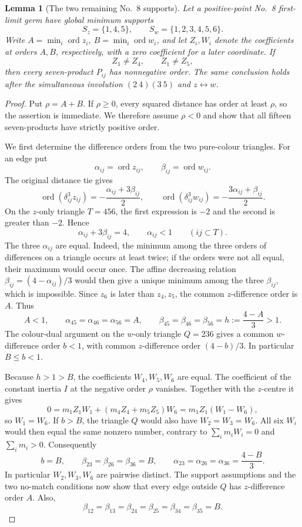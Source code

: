 \documentclass[11pt]{amsart}
\newtheorem{lemma}[theorem]{Lemma}
\theoremstyle{remark}
\newcommand{\ord}{\operatorname{ord}}
\begin{document}
\begin{lemma}[The two remaining No.~8 supports]\label{lem:no8-remaining-support-analytic}
Let a positive-point No.~8 first-limit germ have global minimum supports
\[
S_z=\{1,4,5\},\qquad S_w=\{1,2,3,4,5,6\}.
\]
Write $A=\min_i\ord z_i$, $B=\min_i\ord w_i$, and let $Z_i,W_i$ denote the coefficients at orders $A,B$, respectively, with a zero coefficient for a later coordinate. If
\[
Z_1\ne Z_4,\qquad Z_1\ne Z_5,
\]
then every seven-product $P_{ij}$ has nonnegative order. The same conclusion holds after the simultaneous involution $(2\ 4)(3\ 5)$ and $z\leftrightarrow w$.
\end{lemma}
\begin{proof}
Put $\rho=A+B$. If $\rho\ge0$, every squared distance has order at least $\rho$, so the assertion is immediate. We therefore assume $\rho<0$ and show that all fifteen seven-products have strictly positive order.

We first determine the difference orders from the two pure-colour triangles. For an edge put
\[
\alpha_{ij}=\ord z_{ij},\qquad \beta_{ij}=\ord w_{ij}.
\]
The original distance tie gives
\begin{equation}\label{eq:no8-force-order-analytic}
\ord(\delta_{ij}^3z_{ij})=-\frac{\alpha_{ij}+3\beta_{ij}}2,
\qquad
\ord(\delta_{ij}^3w_{ij})=-\frac{3\alpha_{ij}+\beta_{ij}}2.
\end{equation}
On the $z$-only triangle $T=456$, the first expression is $-2$ and the second is greater than $-2$. Hence
\[
\alpha_{ij}+3\beta_{ij}=4,\qquad \alpha_{ij}<1\qquad(ij\subset T).
\]
The three $\alpha_{ij}$ are equal. Indeed, the minimum among the three orders of differences on a triangle occurs at least twice; if the orders were not all equal, their maximum would occur once. The affine decreasing relation $\beta_{ij}=(4-\alpha_{ij})/3$ would then give a unique minimum among the three $\beta_{ij}$, which is impossible. Since $z_6$ is later than $z_4,z_5$, the common $z$-difference order is $A$. Thus
\[
A<1,\qquad \alpha_{45}=\alpha_{46}=\alpha_{56}=A,
\qquad \beta_{45}=\beta_{46}=\beta_{56}=h:=\frac{4-A}{3}>1.
\]
The colour-dual argument on the $w$-only triangle $Q=236$ gives a common $w$-difference order $b<1$, with common $z$-difference order $(4-b)/3$. In particular $B\le b<1$.

Because $h>1>B$, the coefficients $W_4,W_5,W_6$ are equal. The coefficient of the constant inertia $I$ at the negative order $\rho$ vanishes. Together with the $z$-centre it gives
\[
0=m_1Z_1W_1+(m_4Z_4+m_5Z_5)W_6
  =m_1Z_1(W_1-W_6),
\]
so $W_1=W_6$. If $b>B$, the triangle $Q$ would also have $W_2=W_3=W_6$. All six $W_i$ would then equal the same nonzero number, contrary to $\sum_i m_iW_i=0$ and $\sum_i m_i>0$. Consequently
\begin{equation}\label{eq:no8-Q-orders-analytic}
b=B,\qquad
\beta_{23}=\beta_{26}=\beta_{36}=B,\qquad
\alpha_{23}=\alpha_{26}=\alpha_{36}=\frac{4-B}{3}.
\end{equation}
In particular $W_2,W_3,W_6$ are pairwise distinct. The support assumptions and the two no-match conditions now show that every edge outside $Q$ has $z$-difference order $A$. Also,
\[
\beta_{12}=\beta_{13}=\beta_{24}=\beta_{25}=\beta_{34}=\beta_{35}=B.
\]


\end{proof}
\end{document}
